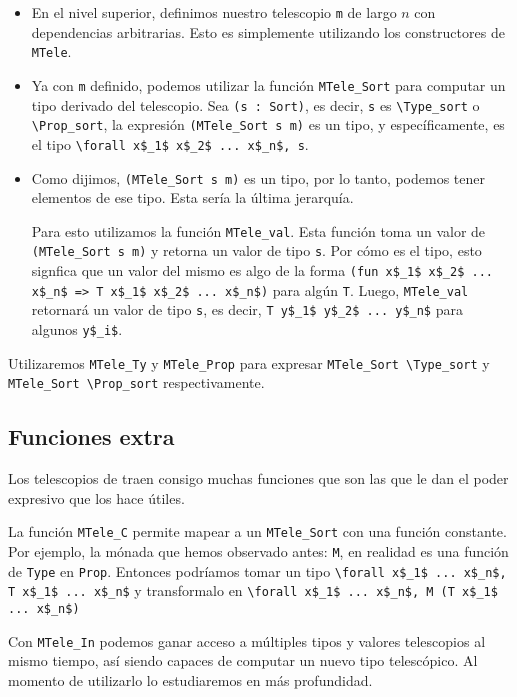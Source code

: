 \begin{itemize}
  \item En el nivel superior, definimos nuestro telescopio \lstinline{m} de largo $n$ con dependencias arbitrarias. Esto es simplemente utilizando los constructores de \lstinline{MTele}.
  \item Ya con \lstinline{m} definido, podemos utilizar la función \lstinline{MTele_Sort} para computar un tipo derivado del telescopio. Sea \lstinline{(s : Sort)}, es decir, \lstinline{s} es \lstinline{\Type_sort} o \lstinline{\Prop_sort}, la expresión \lstinline{(MTele_Sort s m)} es un tipo, y específicamente, es el tipo \lstinline{\forall x$_1$ x$_2$ ... x$_n$, s}.
  \item Como dijimos, \lstinline{(MTele_Sort s m)} es un tipo, por lo tanto, podemos tener elementos de ese tipo. Esta sería la última jerarquía.
  
  Para esto utilizamos la función \lstinline{MTele_val}. Esta función toma un valor de \lstinline{(MTele_Sort s m)} y retorna un valor de tipo \lstinline{s}. Por cómo es el tipo, esto signfica que un valor del mismo es algo de la forma \lstinline{(fun x$_1$ x$_2$ ... x$_n$ => T x$_1$ x$_2$ ... x$_n$)} para algún \lstinline{T}. Luego, \lstinline{MTele_val} retornará un valor de tipo \lstinline{s}, es decir, \lstinline{T y$_1$ y$_2$ ... y$_n$} para algunos \lstinline{y$_i$}.
\end{itemize}

Utilizaremos \lstinline{MTele_Ty} y \lstinline{MTele_Prop} para expresar \lstinline{MTele_Sort \Type_sort} y \lstinline{MTele_Sort \Prop_sort} respectivamente.

\subsection{Funciones extra}

Los telescopios de \Mtac traen consigo muchas funciones que son las que le dan el poder expresivo que los hace útiles. 

La función \lstinline{MTele_C} permite mapear a un \lstinline{MTele_Sort} con una función constante.
Por ejemplo, la mónada que hemos observado antes: \lstinline{M}, en realidad es una función de \lstinline{Type} en \lstinline{Prop}.
Entonces podríamos tomar un tipo \lstinline{\forall x$_1$ ... x$_n$, T x$_1$ ... x$_n$} y transformalo en \lstinline{\forall x$_1$ ... x$_n$, M (T x$_1$ ... x$_n$)}

Con \lstinline{MTele_In} podemos ganar acceso a múltiples tipos y valores telescopios al mismo tiempo, así siendo capaces de computar un nuevo tipo telescópico.
Al momento de utilizarlo lo estudiaremos en más profundidad.

